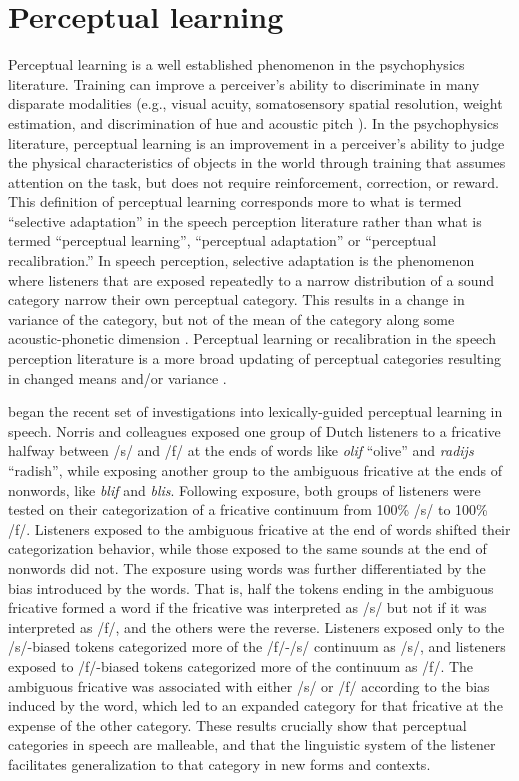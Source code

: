 \section{Perceptual learning}
\label{sec:perceptuallearning}

Perceptual learning is a well established phenomenon in the psychophysics literature. 
Training can improve a perceiver's ability to discriminate in many disparate modalities (e.g., visual acuity, somatosensory spatial resolution, weight estimation, and discrimination of hue and acoustic pitch \citep[see][for review]{Gibson1953}). 
In the psychophysics literature, perceptual learning is an improvement in a perceiver's ability to judge the physical characteristics of objects in the world through training that assumes attention on the task, but does not require reinforcement, correction, or reward.
This definition of perceptual learning corresponds more to what is termed ``selective adaptation'' in the speech perception literature rather than what is termed ``perceptual learning'', ``perceptual adaptation'' or ``perceptual recalibration.''  
In speech perception, selective adaptation is the phenomenon where listeners that are exposed repeatedly to a narrow distribution of a sound category narrow their own perceptual category.
This results in a change in variance of the category, but not of the mean of the category along some acoustic-phonetic dimension \citep{Eimas1973,Samuel1986,Vroomen2007}.
Perceptual learning or recalibration in the speech perception literature is a more broad updating of perceptual categories resulting in changed means and/or variance \citep{Norris2003, Vroomen2007}.

\citet{Norris2003} began the recent set of investigations into lexically-guided perceptual learning in speech.
Norris and colleagues exposed one group of Dutch listeners to a fricative halfway between /s/ and /f/ at the ends of words like \emph{olif} ``olive'' and \emph{radijs} ``radish'', while exposing another group to the ambiguous fricative at the ends of nonwords, like \emph{blif} and \emph{blis}.
Following exposure, both groups of listeners were tested on their categorization of a fricative continuum from 100\% /s/ to 100\% /f/. 
Listeners exposed to the ambiguous fricative at the end of words shifted their categorization behavior, while those exposed to the same sounds at the end of nonwords did not.  The exposure using words was further differentiated by the bias introduced by the words.  That is, half the tokens ending in the ambiguous fricative formed a word if the fricative was interpreted as /s/ but not if it was interpreted as /f/, and the others were the reverse.  
Listeners exposed only to the /s/-biased tokens categorized more of the /f/-/s/ continuum as /s/, and listeners exposed to /f/-biased tokens categorized more of the continuum as /f/.  
The ambiguous fricative was associated with either /s/ or /f/ according to the bias induced by the word, which led to an expanded category for that fricative at the expense of the other category.
These results crucially show that perceptual categories in speech are malleable, and that the linguistic system of the listener facilitates generalization to that category in new forms and contexts.

